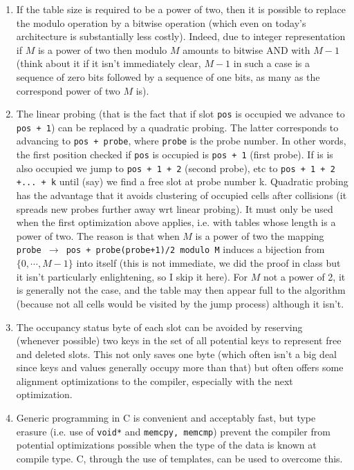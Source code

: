 \documentclass[12pt]{article}
\theoremstyle{plain}
\theoremstyle{remark}
\newcommand{\cpp}{C\nolinebreak\hspace{-.05em}\raisebox{.4ex}{\tiny\bf +}\nolinebreak\hspace{-.10em}\raisebox{.4ex}{\tiny\bf +}}
\begin{document}
\begin{enumerate}
	\item If the table size is required to be a power of two, then it is
		possible to replace the modulo operation by a bitwise operation (which even 
		on today's architecture is substantially less costly). Indeed,
		due to integer representation if $M$ is a power of two then
		modulo $M$ amounts to bitwise AND with $M - 1$ (think about it
		if it isn't immediately clear, $M-1$ in such a case is a
		sequence of zero bits followed by a sequence of one bits, as
		many as the correspond power of two $M$ is).
	\item The linear probing (that is the fact that if slot {\tt pos} is
		occupied we advance to {\tt pos + 1}) can be replaced by a quadratic 
		probing. The latter corresponds to advancing to {\tt pos +
		probe}, where {\tt probe} is the probe number. In other words,
		the first position checked if {\tt pos} is occupied is {\tt pos
		+ 1} (first probe). If is is also occupied we jump to {\tt pos +
		1 + 2} (second probe), etc to {\tt pos + 1 + 2 +... + k} until
		(say) we find a free slot at probe number k. Quadratic probing has the advantage that it 
		avoids clustering of occupied cells after collisions (it spreads
		new probes further away wrt linear probing). It must only be
		used when the first optimization above applies, i.e. with tables
		whose length is a power of two. The reason is that when $M$ is a
		power of two the mapping {\tt probe $\to$ pos  +
		probe(probe+1)/2 modulo M} induces a bijection from 
		$\{0,\cdots , M- 1\}$ into itself (this is not immediate, we did
		the proof in class but it isn't particularly enlightening, so I
		skip it here). For $M$ not a power of 2, it is generally not the
		case, and the table may then appear full to the algorithm
		(because not all cells would be visited by the jump process)
		although it isn't. 
	\item The occupancy status byte of each slot can be avoided by reserving
		(whenever possible) two keys in the set of all potential keys 
		to represent free and deleted slots. This not only saves one
		byte (which often isn't a big deal since keys and values generally
		occupy more than that) but often offers some alignment 
		optimizations to the compiler, especially with the next
		optimization.
	\item  Generic programming in C is convenient and acceptably fast, but
		type erasure (i.e. use of {\tt void*}  and {\tt memcpy, memcmp}) 
		prevent the compiler from potential optimizations possible when
		the type of the data is known at compile type. \cpp, through the
		use of templates, can be used to overcome this.
\end{enumerate}
\end{document}
